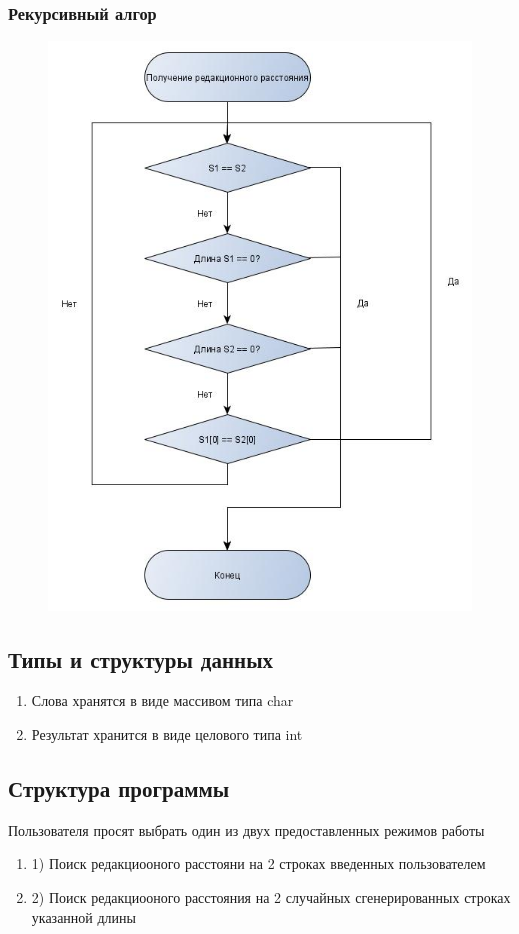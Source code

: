 \documentclass[a4paper, 14pt]{article}
\begin{document}
	\subsubsection{Рекурсивный алгор}
	\begin{figure}[]
		\centering
		\includegraphics[width=0.7\linewidth]{img/1}
		\caption{}
		\label{fig:1}
	\end{figure}
	
	
	\subsection{Типы и структуры данных}
	
	\begin{enumerate}
		\item Слова хранятся в виде массивом типа char
		\item Результат хранится в виде целового типа int

	\end{enumerate}

	\subsection{Структура программы}
	
	Пользователя просят выбрать один из двух предоставленных режимов работы
	
	\begin{enumerate}
		\item 1) Поиск редакциооного расстояни на 2 строках введенных пользователем
		\item 2) Поиск редакциооного расстояния на 2 случайных сгенерированных строках указанной длины
	\end{enumerate}
	
\end{document}
